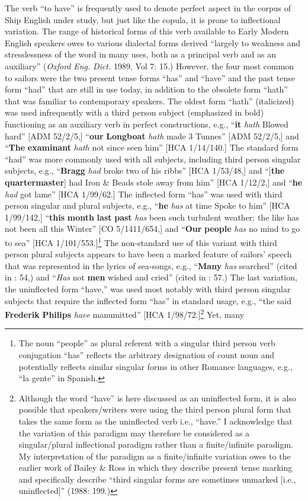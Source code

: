   The verb “to have” is frequently used to denote perfect aspect in the corpus of Ship English under study, but just like the copula, it is prone to inflectional variation.  The range of historical forms of this verb available to Early Modern English speakers owes to various dialectal forms derived “largely to weakness and stresslessness of the word in many uses, both as a principal verb and as an auxiliary” (\textit{Oxford} \textit{Eng.} \textit{Dict.} 1989, Vol 7: 15.) However, the four most common to sailors were the two present tense forms “has” and “have” and the past tense form “had” that are still in use today, in addition to the obsolete form “hath” that was familiar to contemporary speakers. The oldest form “hath” (italicized) was used infrequently with a third person subject (emphasized in bold) functioning as an auxiliary verb in perfect constructions, e.g., “\textbf{it} \textit{hath} Blowed hard” [ADM 52/2/5,] “\textbf{our} \textbf{Longboat} \textit{hath} made 3 Tunnes” [ADM 52/2/5,] and “\textbf{The} \textbf{examinant} \textit{hath} not since seen him” [HCA 1/14/140.] The standard form “had” was more commonly used with all subjects, including third person singular subjects, e.g., “\textbf{Bragg} \textit{had} broke two of his ribbs” [HCA 1/53/48,] and “[\textbf{the} \textbf{quartermaster}] had Iron \& Beads stole away from him” [HCA 1/12/2,] and “\textbf{he} \textit{had} got lame” [HCA 1/99/62.] The inflected form “has” was used with third person singular and plural subjects, e.g., “\textbf{he} \textit{has} at time Spoke to him” [HCA 1/99/142,] “\textbf{this} \textbf{month} \textbf{last} \textbf{past} \textit{has} been such turbulent weather: the like has not been all this Winter” [CO 5/1411/654,] and “\textbf{Our} \textbf{people} \textit{has} no mind to go to sea” [HCA 1/101/553.]\footnote{The noun “people” as plural referent with a singular third person verb conjugation “has” reflects the arbitrary designation of count noun and potentially reflects similar singular forms in other Romance languages, e.g., “la gente” in Spanish.} The non-standard use of this variant with third person plural subjects appears to have been a marked feature of sailors’ speech that was represented in the lyrics of sea-songs, e.g., “\textbf{Many} \textit{has} searched” (cited in \citealt{Palmer1986}: 54,) and “\textit{Has} not \textbf{men} wished and cried” (cited in \citealt{Palmer1986}: 57.) The last variation, the uninflected form “have,” was used most notably with third person singular subjects that require the inflected form “has” in standard usage, e.g., “the said \textbf{Frederik} \textbf{Philips} \textit{have} manumitted” [HCA 1/98/72.]\footnote{Although the word “have” is here discussed as an uninflected form, it is also possible that speakers/writers were using the third person plural form that takes the same form as the uninflected verb i.e., “have.” I acknowledge that the variation of this paradigm may therefore be considered as a singular/plural inflectional paradigm rather than a finite/infinite paradigm. My interpretation of the paradigm as a finite/infinite variation owes to the earlier work of Bailey \& Ross in which they describe present tense marking and specifically describe “third singular forms are sometimes unmarked [i.e., uninflected]” (1988: 199.)} Yet, many 